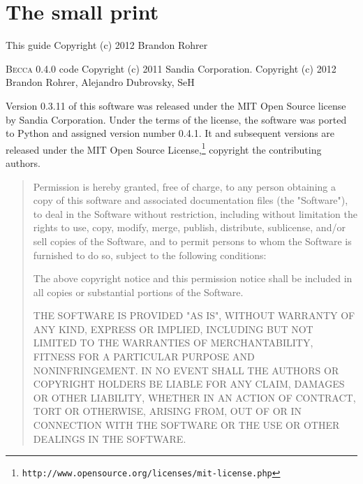 \chapter{The small print}

This guide
Copyright (c) 2012 Brandon Rohrer

\textsc{Becca} 0.4.0 code
Copyright (c) 2011 Sandia Corporation. 
Copyright (c) 2012 Brandon Rohrer, Alejandro Dubrovsky, SeH

Version 0.3.11 of this software was released under the MIT Open Source 
license by Sandia Corporation. Under the terms of the license, the 
software was ported to Python and assigned version number 0.4.1. It and
subsequent versions are released under the MIT Open Source License,\footnote{\texttt{http://www.opensource.org/licenses/mit-license.php}} copyright the contributing authors.

\begin{quote}
Permission is hereby granted, free of charge, to any person obtaining a copy
of this software and associated documentation files (the "Software"), to deal
in the Software without restriction, including without limitation the rights
to use, copy, modify, merge, publish, distribute, sublicense, and/or sell
copies of the Software, and to permit persons to whom the Software is
furnished to do so, subject to the following conditions:

The above copyright notice and this permission notice shall be included in
all copies or substantial portions of the Software.

THE SOFTWARE IS PROVIDED "AS IS", WITHOUT WARRANTY OF ANY KIND, EXPRESS OR
IMPLIED, INCLUDING BUT NOT LIMITED TO THE WARRANTIES OF MERCHANTABILITY,
FITNESS FOR A PARTICULAR PURPOSE AND NONINFRINGEMENT. IN NO EVENT SHALL THE
AUTHORS OR COPYRIGHT HOLDERS BE LIABLE FOR ANY CLAIM, DAMAGES OR OTHER
LIABILITY, WHETHER IN AN ACTION OF CONTRACT, TORT OR OTHERWISE, ARISING FROM,
OUT OF OR IN CONNECTION WITH THE SOFTWARE OR THE USE OR OTHER DEALINGS IN
THE SOFTWARE.

\end{quote}